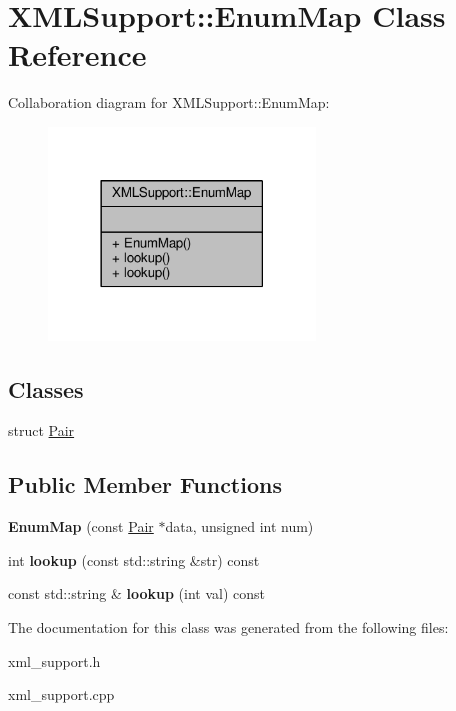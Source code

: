 \hypertarget{classXMLSupport_1_1EnumMap}{}\section{X\+M\+L\+Support\+:\+:Enum\+Map Class Reference}
\label{classXMLSupport_1_1EnumMap}


Collaboration diagram for X\+M\+L\+Support\+:\+:Enum\+Map\+:
\nopagebreak
\begin{figure}[H]
\begin{center}
\leavevmode
\includegraphics[width=201pt]{dc/d3a/classXMLSupport_1_1EnumMap__coll__graph}
\end{center}
\end{figure}
\subsection*{Classes}
\begin{DoxyCompactItemize}
\item 
struct \hyperlink{structXMLSupport_1_1EnumMap_1_1Pair}{Pair}
\end{DoxyCompactItemize}
\subsection*{Public Member Functions}
\begin{DoxyCompactItemize}
\item 
{\bfseries Enum\+Map} (const \hyperlink{structXMLSupport_1_1EnumMap_1_1Pair}{Pair} $\ast$data, unsigned int num)\hypertarget{classXMLSupport_1_1EnumMap_a281a7adbd33e873d8042c08250e33480}{}\label{classXMLSupport_1_1EnumMap_a281a7adbd33e873d8042c08250e33480}

\item 
int {\bfseries lookup} (const std\+::string \&str) const \hypertarget{classXMLSupport_1_1EnumMap_a8c47c4e35c3107bf0f13dd032900e95b}{}\label{classXMLSupport_1_1EnumMap_a8c47c4e35c3107bf0f13dd032900e95b}

\item 
const std\+::string \& {\bfseries lookup} (int val) const \hypertarget{classXMLSupport_1_1EnumMap_a1e72a753b311be8104fda5777912f37d}{}\label{classXMLSupport_1_1EnumMap_a1e72a753b311be8104fda5777912f37d}

\end{DoxyCompactItemize}


The documentation for this class was generated from the following files\+:\begin{DoxyCompactItemize}
\item 
xml\+\_\+support.\+h\item 
xml\+\_\+support.\+cpp\end{DoxyCompactItemize}
